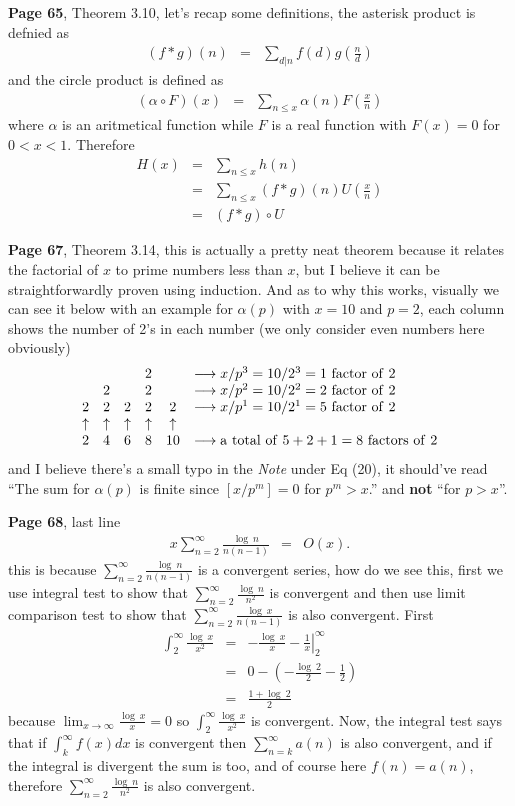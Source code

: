 \documentclass[aps,preprint,preprintnumbers,nofootinbib,showpacs,prd]{revtex4-1}
\newcommand{\nbea}{\begin{eqnarray*}}
\newcommand{\neea}{\end{eqnarray*}}
\begin{document}
{\bf Page 65}, Theorem 3.10, let's recap some definitions, the asterisk product is defnied as
%
\nbea
(f * g)(n) & = & \sum_{d|n} f(d) g\left(\frac{n}{d}\right)
\neea
%
and the circle product is defined as
%
\nbea
\left ( \alpha \circ F \right ) (x) & = & \sum_{n\le x}\alpha(n) F\left ( \frac{x}{n}\right )
\neea
%
where $\alpha$ is an aritmetical function while $F$ is a real function with $F(x) = 0$ for $0 < x < 1$. Therefore
%
\nbea
H(x) & = & \sum_{n \le x}h(n) \\
& = & \sum_{n \le x} (f * g)(n) U\left ( \frac{x}{n}\right ) \\
& = & (f * g) \circ U
\neea
%

{\bf Page 67}, Theorem 3.14, this is actually a pretty neat theorem because it relates the factorial of $x$ to prime numbers less than $x$, but I believe it can be straightforwardly proven using induction. And as to why this works, visually we can see it below with an example for  $\alpha(p)$ with $x=10$ and $p=2$, each column shows the number of 2's in each number (we only consider even numbers here obviously)
%
\nbea
\begin{array}{c c c c c l}
   &    &   & 2  &  & \longrightarrow x/p^3 = 10/2^3 = 1 {\rm~factor~of~} 2\\
   & 2 &    & 2 &   & \longrightarrow x/p^2 = 10/2^2 = 2 {\rm~factor~of~} 2\\
2 & 2 & 2 & 2 & 2 & \longrightarrow x/p^1 = 10/2^1 = 5 {\rm~factor~of~} 2\\
\uparrow & \uparrow & \uparrow & \uparrow & \uparrow \\
2 & 4 & 6 & 8 & 10 & \longrightarrow {\rm a~total~of~}5+2+1=8{\rm~factors~of~}2
\end{array}
\neea
%
and I believe there's a small typo in the {\it Note} under Eq (20), it should've read ``The sum for $\alpha(p)$ is finite since $\left \lbrack x/p^m\right \rbrack = 0$ for $p^m>x$.'' and {\bf not} ``for $p > x$''.

{\bf Page 68}, last line
%
\nbea
x \sum_{n=2}^{\infty} \frac{\log~n}{n(n-1)} & = & O(x).
\neea
%
this is because $\sum_{n=2}^{\infty} \frac{\log~n}{n(n-1)}$ is a convergent series, how do we see this, first we use integral test to show that $\sum_{n=2}^{\infty} \frac{\log~n}{n^2}$ is convergent and then use limit comparison test to show that $\sum_{n=2}^{\infty} \frac{\log~x}{n(n-1)}$ is also convergent. First
%
\nbea
\int_2^\infty \frac{\log~x}{x^2} & = & \left. -\frac{\log~x}{x} - \frac{1}{x} \right |_2^\infty \\
& = & 0 - \left ( -\frac{\log~2}{2} - \frac{1}{2} \right ) \\
& = & \frac{1 + \log~2}{2}
\neea
%
because $\lim_{x\to\infty}\frac{\log~x}{x} = 0$ so $\int_2^\infty \frac{\log~x}{x^2}$ is convergent. Now, the integral test says that  if $\int_k^\infty f(x) dx$ is convergent then $\sum_{n=k}^{\infty} a(n)$ is also convergent, and if the integral is divergent the sum is too, and of course here $f(n) = a(n)$, therefore $\sum_{n=2}^{\infty} \frac{\log~n}{n^2}$ is also convergent.
\end{document}

